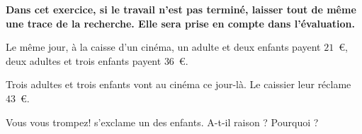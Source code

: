 
\medskip  

\textbf{Dans cet exercice, si le travail n'est pas terminé, laisser tout de même une trace de la recherche. Elle sera prise en compte dans l'évaluation.}

\medskip 

Le même jour, à la caisse d'un cinéma, un adulte et deux enfants payent $21$~\euro, deux adultes et trois enfants payent $36$~\euro. 

Trois adultes et trois enfants vont au cinéma ce jour-là. Le caissier leur réclame $43$~\euro.

\og Vous vous trompez! \fg{} s'exclame un des enfants. A-t-il raison ? Pourquoi ?
